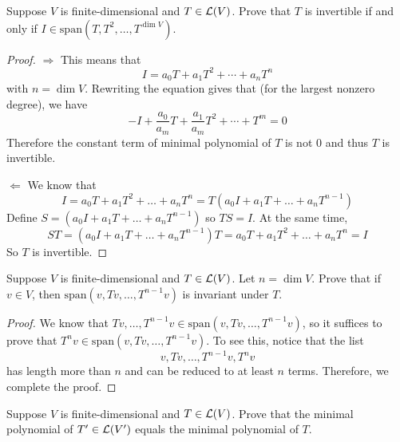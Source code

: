 \documentclass{extarticle}
\begin{document}
\begin{problem}{22}
    Suppose \(V\) is finite-dimensional and \(T \in \mathcal{L}(V)\). Prove that \(T\) is invertible if and only 
    if \(I \in \text{span}(T, T^2, \ldots, T^{\dim V})\). 
\end{problem}

\begin{proof}
\(\Rightarrow\) This means that 
\[I = a_0 T + a_1 T^2 + \cdots + a_n T^n\]
with \(n = \dim V\). Rewriting the equation gives that (for the largest nonzero degree), we have 
\[-I + \frac{a_0}{a_m}T + \frac{a_1}{a_m}T^2 + \cdots + T^m = 0\]
Therefore the constant term of minimal polynomial of \(T\) is not 0 and thus \(T\) is invertible. 




\(\Leftarrow\) We know that 
\[I = a_0 T + a_1 T^2 + \ldots + a_n T^n = T(a_0 I + a_1 T + \ldots + a_nT^{n-1})\]
Define \(S = (a_0 I + a_1 T + \ldots + a_nT^{n-1})\) so \(TS = I\). At the same time,
\[ST = (a_0 I + a_1 T + \ldots + a_n T^{n-1})T = a_0 T + a_1 T^2 + \ldots + a_n T^n 
= I\]
So \(T\) is invertible. 
\end{proof}

\begin{problem}{23}
    Suppose \(V\) is finite-dimensional and \(T \in \mathcal{L}(V)\). Let \(n = \dim V\). Prove that 
    if \(v \in V\), then \(\text{span}(v, Tv, \ldots, T^{n-1}v)\) is invariant under \(T\).
\end{problem}

\begin{proof}
We know that \(Tv, \ldots, T^{n-1}v \in \text{span}(v, Tv, \ldots, T^{n-1}v)\), so it suffices 
to prove that \(T^n v \in \text{span}(v, Tv, \ldots, T^{n-1}v)\). To see this, notice that the list 
\[v, Tv, \ldots, T^{n-1}v, T^n v\]
has length more than \(n\) and can be reduced to at least \(n\) terms. Therefore, we complete the proof.
\end{proof}


\begin{problem}{28}
    Suppose \(V\) is finite-dimensional and \(T \in \mathcal{L}(V)\). Prove that the minimal polynomial of 
    \(T' \in \mathcal{L}(V')\) equals the minimal polynomial of \(T\).
\end{problem}
\end{document}
